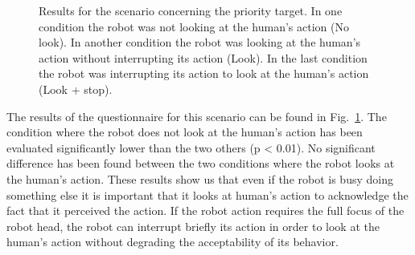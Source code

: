 \documentclass[english,a4paper,11pt,twoside]{StyleThese}
\begin{document}
\begin{figure}[!h]
\centering
	\hfill
    \caption{Results for the scenario concerning the priority target. In one condition the robot was not looking at the human's action (No look). In another condition the robot was looking at the human's action without interrupting its action (Look). In the last condition the robot was interrupting its action to look at the human's action (Look + stop).}
    \label{fig:resSce6}
\end{figure}

The results of the questionnaire for this scenario can be found in Fig.~\ref{fig:resSce6}. The condition where the robot does not look at the human's action has been evaluated significantly lower than the two others (p < 0.01). No significant difference has been found between the two conditions where the robot looks at the human's action. These results show us that even if the robot is busy doing something else it is important that it looks at human's action to acknowledge the fact that it perceived the action. If the robot action requires the full focus of the robot head, the robot can interrupt briefly its action in order to look at the human's action without degrading the acceptability of its behavior.
\end{document}
